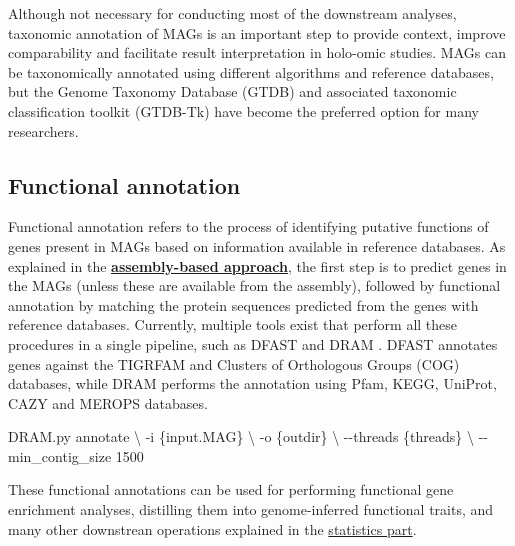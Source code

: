 \documentclass[
]{book}
\newenvironment{Shaded}{\begin{snugshade}}{\end{snugshade}}
\newcommand{\AttributeTok}[1]{\textcolor[rgb]{0.77,0.63,0.00}{#1}}
\newcommand{\DataTypeTok}[1]{\textcolor[rgb]{0.13,0.29,0.53}{#1}}
\newcommand{\ExtensionTok}[1]{#1}
\newcommand{\NormalTok}[1]{#1}
\begin{document}
Although not necessary for conducting most of the downstream analyses, taxonomic annotation of MAGs is an important step to provide context, improve comparability and facilitate result interpretation in holo-omic studies. MAGs can be taxonomically annotated using different algorithms and reference databases, but the Genome Taxonomy Database (GTDB) \citep{Parks2022-zl} and associated taxonomic classification toolkit (GTDB-Tk) \citep{Chaumeil2022-jr} have become the preferred option for many researchers.

\hypertarget{genome-resolved-function}{%
\subsection*{Functional annotation}\label{genome-resolved-function}}

Functional annotation refers to the process of identifying putative functions of genes present in MAGs based on information available in reference databases. As explained in the \textbf{\protect\hyperlink{assembly-based}{assembly-based approach}}, the first step is to predict genes in the MAGs (unless these are available from the assembly), followed by functional annotation by matching the protein sequences predicted from the genes with reference databases. Currently, multiple tools exist that perform all these procedures in a single pipeline, such as DFAST \citep{Tanizawa2017-uy} and DRAM \citep{Shaffer2020-kp}. DFAST annotates genes against the TIGRFAM and Clusters of Orthologous Groups (COG) databases, while DRAM performs the annotation using Pfam, KEGG, UniProt, CAZY and MEROPS databases.

\small

\begin{Shaded}
\begin{Highlighting}[]
\ExtensionTok{DRAM.py}\NormalTok{ annotate }\DataTypeTok{\textbackslash{}}
      \AttributeTok{{-}i}\NormalTok{ \{input.MAG\} }\DataTypeTok{\textbackslash{}}
      \AttributeTok{{-}o}\NormalTok{ \{outdir\} }\DataTypeTok{\textbackslash{}}
      \AttributeTok{{-}{-}threads}\NormalTok{ \{threads\} }\DataTypeTok{\textbackslash{}}
      \AttributeTok{{-}{-}min\_contig\_size}\NormalTok{ 1500}
\end{Highlighting}
\end{Shaded}

\normalsize

These functional annotations can be used for performing functional gene enrichment analyses, distilling them into genome-inferred functional traits, and many other downstrean operations explained in the \protect\hyperlink{about-statistics}{statistics part}.
\end{document}
